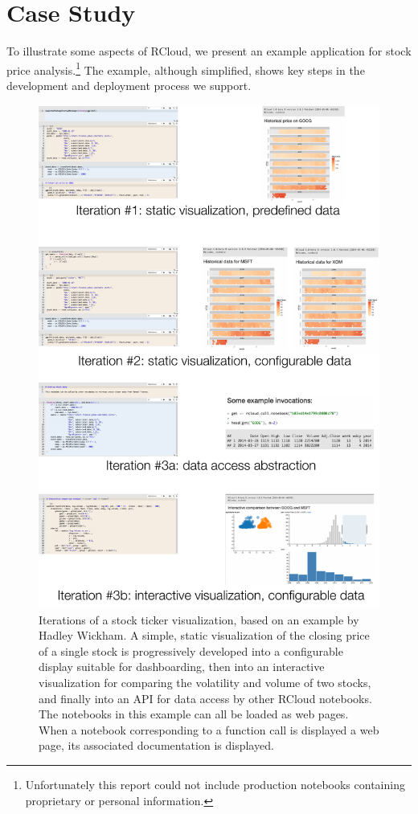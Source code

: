\section{Case Study}

To illustrate some aspects of RCloud, we present an example application
for stock price analysis.\footnote{Unfortunately this report could not
include production notebooks containing proprietary or personal information.}
The example, although simplified, shows key steps in the development
and deployment process we support.

\begin{figure}
\includegraphics[width=\linewidth]{fig/casestudy1/casestudy1.pdf}
\caption{\label{fig:stockvis}Iterations of a stock ticker
  visualization, based on an example by Hadley Wickham. A
  simple, static visualization of the closing price of a single stock
  is progressively developed into a configurable display suitable
  for dashboarding, then into an interactive visualization for 
  comparing the volatility and volume of two stocks, and finally
  into an API for data access by other RCloud notebooks. The notebooks
  in this example can all be loaded as web pages. When a notebook
  corresponding to a function call is displayed a web page,
  its associated documentation is displayed.}
\end{figure}

